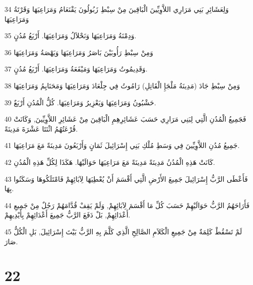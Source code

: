 \par 34 وَلِعَشَائِرِ بَنِي مَرَارِي اللاَّوِيِّينَ الْبَاقِينَ مِنْ سِبْطِ زَبُولُونَ يَقْنَعَامُ وَمَرَاعِيَهَا وَقَرْتَةُ وَمَرَاعِيَهَا
\par 35 وَدِمْنَةُ وَمَرَاعِيَهَا وَنَحْلاَلُ وَمَرَاعِيَهَا. أَرْبَعُ مُدُنٍ.
\par 36 وَمِنْ سِبْطِ رَأُوبَيْنَ بَاصَرُ وَمَرَاعِيَهَا وَيَهْصَةُ وَمَرَاعِيَهَا
\par 37 وَقَدِيمُوتُ وَمَرَاعِيَهَا وَمَيْفَعَةُ وَمَرَاعِيَهَا. أَرْبَعُ مُدُنٍ.
\par 38 وَمِنْ سِبْطِ جَادَ (مَدِينَةُ مَلْجَإِ الْقَاتِلِ) رَامُوتُ فِي جِلْعَادَ وَمَرَاعِيَهَا وَمَحَنَايِمُ وَمَرَاعِيَهَا
\par 39 حَشْبُونُ وَمَرَاعِيَهَا وَيَعْزِيرُ وَمَرَاعِيَهَا. كُلُّ الْمُدُنِ أَرْبَعٌ.
\par 40 فَجَمِيعُ الْمُدُنِ الَّتِي لِبَنِي مَرَارِي حَسَبَ عَشَائِرِهِمِ الْبَاقِينَ مِنْ عَشَائِرِ اللاَّوِيِّينَ, وَكَانَتْ قُرْعَتُهُمُ اثْنَتَا عَشْرَةَ مَدِينَةً.
\par 41 جَمِيعُ مُدُنِ اللاَّوِيِّينَ فِي وَسَطِ مُلْكِ بَنِي إِسْرَائِيلَ ثَمَانٍ وَأَرْبَعُونَ مَدِينَةً مَعَ مَرَاعِيَهَا.
\par 42 كَانَتْ هَذِهِ الْمُدُنُ مَدِينَةً مَدِينَةً مَعَ مَرَاعِيَهَا حَوَالَيْهَا. هَكَذَا لِكُلِّ هَذِهِ الْمُدُنِ.
\par 43 فَأَعْطَى الرَّبُّ إِسْرَائِيلَ جَمِيعَ الأَرْضِ الَّتِي أَقْسَمَ أَنْ يُعْطِيَهَا لِآبَائِهِمْ فَامْتَلَكُوهَا وَسَكَنُوا بِهَا.
\par 44 فَأَرَاحَهُمُ الرَّبُّ حَوَالَيْهِمْ حَسَبَ كُلِّ مَا أَقْسَمَ لِآبَائِهِمْ, وَلَمْ يَقِفْ قُدَّامَهُمْ رَجُلٌ مِنْ جَمِيعِ أَعْدَائِهِمْ, بَلْ دَفَعَ الرَّبُّ جَمِيعَ أَعْدَائِهِمْ بِأَيْدِيهِمْ.
\par 45 لَمْ تَسْقُطْ كَلِمَةٌ مِنْ جَمِيعِ الْكَلاَمِ الصَّالِحِ الَّذِي كَلَّمَ بِهِ الرَّبُّ بَيْتَ إِسْرَائِيلَ, بَلِ الْكُلُّ صَارَ.

\chapter{22}

